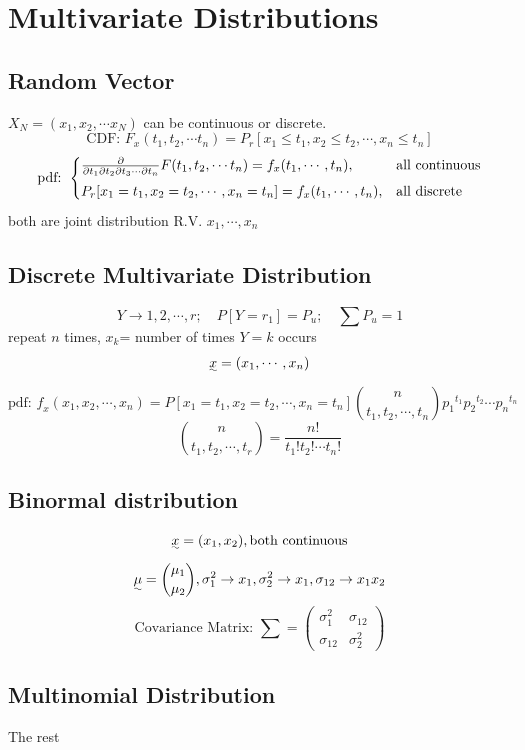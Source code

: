 \documentclass{article}
\begin{document}
\section{Multivariate Distributions}{
    \subsection{Random Vector}{

        \(X_N=(x_1, x_2, \cdots x_N)\) can be continuous or discrete.
        \[\text{CDF: } F_x(t_1, t_2, \cdots t_n)= P_r[x_1\leqslant t_1,x_2\leqslant t_2, \cdots, x_n\leqslant t_n]\]
        \[\text{pdf: } \begin{cases}
            \frac{\partial}{\partial t_1 \partial t_2 \partial t_3 \cdots \partial t_n} F(t_1, t_2, \cdots t_n)= f_{\uwave{x}}(t_1, \cdots, t_n), & \text{all continuous}\\
            P_r[x_1= t_1,x_2= t_2, \cdots, x_n= t_n]=f_{x}(t_1, \cdots, t_n), & \text{all discrete}
        \end{cases}\]
        both are joint distribution R.V. $x_1, \cdots, x_n$
    }
    \subsection{Discrete Multivariate Distribution}{
        \[ Y\rightarrow 1, 2, \cdots, r; \quad P[Y=r_1]=P_u; \quad \sum P_u= 1\]
        repeat $n$ times, $x_k$= number of times $Y = k$ occurs 
        \[\uwave{x}= (x_1, \cdots, x_n)\]
        \[\text{pdf: } \mathit{f_x}(x_1, x_2, \cdots, x_n) = P[x_1=t_1, x_2=t_2, \cdots, x_n=t_n]{n \choose t_1, t_2, \cdots, t_n}{p_1}^{t_1}{p_2}^{t_2}\cdots{p_n}^{t_n}\]
        \[{n \choose t_1, t_2, \cdots, t_r}= \frac{n !}{t_1! t_2! \cdots t_n!}\]
    }
    \subsection{Binormal distribution}{
        \[\uwave{x}=(x_1,x_2), \text{both continuous}\]
        \[\uwave{\mu}= { \mu_1 \choose \mu_2}, \sigma_1^2 \rightarrow x_1, \sigma_2^2 \rightarrow x_1, \sigma_{12} \rightarrow x_1x_2 \]
        \[\text{Covariance Matrix: } \sum= \begin{pmatrix} 
        \sigma_1^2 & \sigma_{12} \\ 
        \sigma_{12} & \sigma_2^2 \end{pmatrix} \]
    }
    \subsection{Multinomial Distribution}{
        The rest

}}
\end{document}

